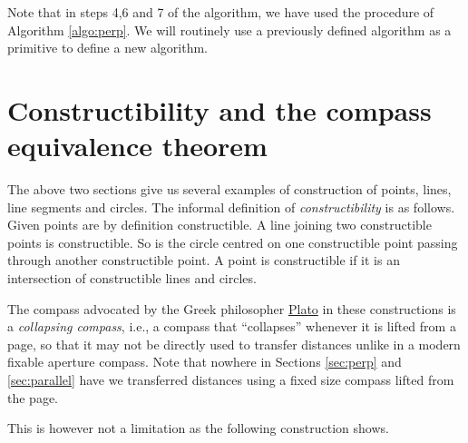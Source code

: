 Note that in steps 4,6 and 7 of the algorithm, we have used the procedure of Algorithm \ref{algo:perp}. We will routinely use a previously defined algorithm as a primitive to define a new algorithm.
\section{Constructibility and the compass equivalence theorem}

The above two sections give us several examples of construction of points, lines, line segments and circles. The informal definition of {\em constructibility} is as follows.  Given points are by definition constructible. A line joining two constructible points is constructible. So is the circle centred on one constructible point passing through another constructible point. A point is constructible if it is an intersection of constructible lines and circles.

The compass advocated by the Greek philosopher \href{https://en.wikipedia.org/wiki/Plato}{Plato} in these constructions is a {\em collapsing compass}, i.e., a compass that ``collapses'' whenever it is lifted from a page, so that it may not be directly used to transfer distances unlike in a modern fixable aperture compass. Note that nowhere in Sections \ref{sec:perp} and \ref{sec:parallel} have we transferred distances using a fixed size compass lifted from the page.

This is however not a limitation as the following construction shows.

